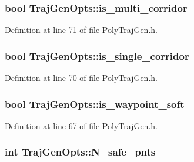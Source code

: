 \subsubsection[{\texorpdfstring{is\+\_\+multi\+\_\+corridor}{is_multi_corridor}}]{\setlength{\rightskip}{0pt plus 5cm}bool Traj\+Gen\+Opts\+::is\+\_\+multi\+\_\+corridor}\hypertarget{struct_traj_gen_opts_a7ba33a57327fba375f137f1f0104c1ea}{}\label{struct_traj_gen_opts_a7ba33a57327fba375f137f1f0104c1ea}


Definition at line 71 of file Poly\+Traj\+Gen.\+h.

\subsubsection[{\texorpdfstring{is\+\_\+single\+\_\+corridor}{is_single_corridor}}]{\setlength{\rightskip}{0pt plus 5cm}bool Traj\+Gen\+Opts\+::is\+\_\+single\+\_\+corridor}\hypertarget{struct_traj_gen_opts_ad4725655d38467206ed000eacfd6c54a}{}\label{struct_traj_gen_opts_ad4725655d38467206ed000eacfd6c54a}


Definition at line 70 of file Poly\+Traj\+Gen.\+h.

\subsubsection[{\texorpdfstring{is\+\_\+waypoint\+\_\+soft}{is_waypoint_soft}}]{\setlength{\rightskip}{0pt plus 5cm}bool Traj\+Gen\+Opts\+::is\+\_\+waypoint\+\_\+soft}\hypertarget{struct_traj_gen_opts_a5f27ab3f06720accfeaf88d44da2c5d6}{}\label{struct_traj_gen_opts_a5f27ab3f06720accfeaf88d44da2c5d6}


Definition at line 67 of file Poly\+Traj\+Gen.\+h.

\subsubsection[{\texorpdfstring{N\+\_\+safe\+\_\+pnts}{N_safe_pnts}}]{\setlength{\rightskip}{0pt plus 5cm}int Traj\+Gen\+Opts\+::\+N\+\_\+safe\+\_\+pnts}\hypertarget{struct_traj_gen_opts_a216fe9912362cc5e876f945112811c35}{}\label{struct_traj_gen_opts_a216fe9912362cc5e876f945112811c35}


